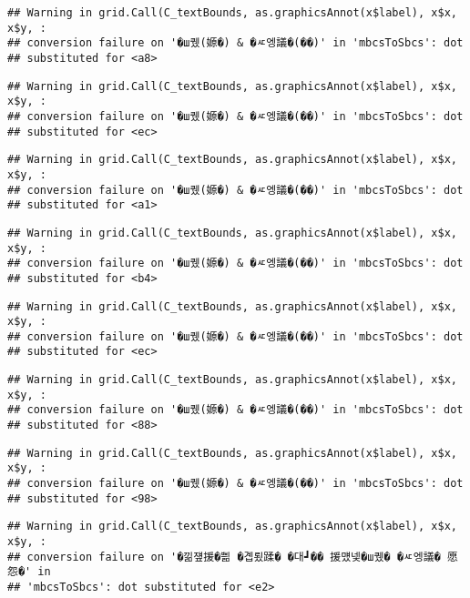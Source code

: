 \documentclass[
]{article}
\begin{document}
\begin{verbatim}
## Warning in grid.Call(C_textBounds, as.graphicsAnnot(x$label), x$x, x$y, :
## conversion failure on '�ш퀬(嫄�) & �ㅼ엥議�(��)' in 'mbcsToSbcs': dot
## substituted for <a8>
\end{verbatim}

\begin{verbatim}
## Warning in grid.Call(C_textBounds, as.graphicsAnnot(x$label), x$x, x$y, :
## conversion failure on '�ш퀬(嫄�) & �ㅼ엥議�(��)' in 'mbcsToSbcs': dot
## substituted for <ec>
\end{verbatim}

\begin{verbatim}
## Warning in grid.Call(C_textBounds, as.graphicsAnnot(x$label), x$x, x$y, :
## conversion failure on '�ш퀬(嫄�) & �ㅼ엥議�(��)' in 'mbcsToSbcs': dot
## substituted for <a1>
\end{verbatim}

\begin{verbatim}
## Warning in grid.Call(C_textBounds, as.graphicsAnnot(x$label), x$x, x$y, :
## conversion failure on '�ш퀬(嫄�) & �ㅼ엥議�(��)' in 'mbcsToSbcs': dot
## substituted for <b4>
\end{verbatim}

\begin{verbatim}
## Warning in grid.Call(C_textBounds, as.graphicsAnnot(x$label), x$x, x$y, :
## conversion failure on '�ш퀬(嫄�) & �ㅼ엥議�(��)' in 'mbcsToSbcs': dot
## substituted for <ec>
\end{verbatim}

\begin{verbatim}
## Warning in grid.Call(C_textBounds, as.graphicsAnnot(x$label), x$x, x$y, :
## conversion failure on '�ш퀬(嫄�) & �ㅼ엥議�(��)' in 'mbcsToSbcs': dot
## substituted for <88>
\end{verbatim}

\begin{verbatim}
## Warning in grid.Call(C_textBounds, as.graphicsAnnot(x$label), x$x, x$y, :
## conversion failure on '�ш퀬(嫄�) & �ㅼ엥議�(��)' in 'mbcsToSbcs': dot
## substituted for <98>
\end{verbatim}

\begin{verbatim}
## Warning in grid.Call(C_textBounds, as.graphicsAnnot(x$label), x$x, x$y, :
## conversion failure on '�낆쟾援�쁾 �곕룄蹂� �대┛�� 援먰넻�ш퀬� �ㅼ엥議� 愿怨�' in
## 'mbcsToSbcs': dot substituted for <e2>
\end{verbatim}
\end{document}
